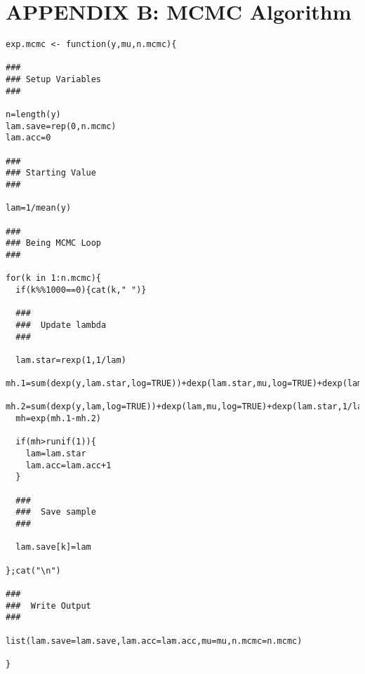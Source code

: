 \documentclass[12pt]{article} \topmargin=.1in \oddsidemargin=.25in
\begin{document}
\section*{APPENDIX B: MCMC Algorithm}
\begin{verbatim}
exp.mcmc <- function(y,mu,n.mcmc){

###
### Setup Variables
###

n=length(y)
lam.save=rep(0,n.mcmc)
lam.acc=0

###
### Starting Value
###

lam=1/mean(y)

###
### Being MCMC Loop
###

for(k in 1:n.mcmc){
  if(k%%1000==0){cat(k," ")}

  ###
  ###  Update lambda
  ###

  lam.star=rexp(1,1/lam)
  mh.1=sum(dexp(y,lam.star,log=TRUE))+dexp(lam.star,mu,log=TRUE)+dexp(lam,1/lam.star,log=TRUE)
  mh.2=sum(dexp(y,lam,log=TRUE))+dexp(lam,mu,log=TRUE)+dexp(lam.star,1/lam,log=TRUE)
  mh=exp(mh.1-mh.2)
  
  if(mh>runif(1)){
    lam=lam.star
    lam.acc=lam.acc+1
  }
  
  ###  
  ###  Save sample
  ###
  
  lam.save[k]=lam

};cat("\n")

###
###  Write Output
###

list(lam.save=lam.save,lam.acc=lam.acc,mu=mu,n.mcmc=n.mcmc)
 
}
  
\end{verbatim}

\end{document}
